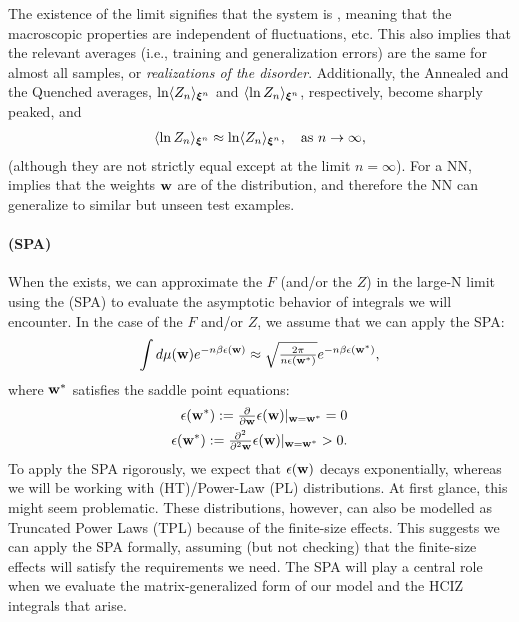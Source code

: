 The existence of the limit signifies that the system is \emph{\SelfAveraging}, meaning that
the macroscopic properties are independent of fluctuations, etc.
This also implies that the relevant averages
(i.e., training and generalization errors) are the same for almost all samples, or \emph{realizations of the disorder}.
Additionally, the Annealed and the Quenched averages,
$\ln \langle Z_n \rangle_{\boldsymbol{\xi}^{n}}$ and $\langle \ln Z_n \rangle_{\boldsymbol{\xi}^{n}}$, respectively,
become sharply peaked, and
\begin{align}
\langle \ln Z_n \rangle_{\boldsymbol{\xi}^{n}} \approx \ln \langle Z_n \rangle_{\boldsymbol{\xi}^{n}}, \quad \text{as } n \to \infty,
\end{align}
(although they are not strictly equal except at the limit $n = \infty$).
For a NN, \SelfAveraging implies that the weights ${\mathbf{w}}$ are \emph{\Typical} of the distribution,
and therefore the NN can generalize to similar but unseen test examples.

\paragraph{\SaddlePointApproximation (SPA)}
When the \ThermodynamicLimit exists, 
we can approximate the  \FreeEnergy $F$ 
(and/or the \PartitionFunction $Z$) in the large-N limit
using the \SaddlePointApproximation (SPA) to evaluate the asymptotic behavior of 
integrals we will encounter.
In the case of the $F$ and/or $Z$, we assume that we can apply the SPA:
\begin{align}
  \label{eqn:SPA}
  \int d\mu({\mathbf{w}}) e^{-n\beta\epsilon({\mathbf{w}})}\approx \sqrt{\tfrac{2\pi}{n\epsilon({\mathbf{w}}^{*})}} e^{-n\beta\epsilon({\mathbf{w}}^{*})}  ,
\end{align}
where ${\mathbf{w}}^{*}$ satisfies the saddle point equations:
\begin{align}
  \epsilon({\mathbf{w}}^{*}):=\tfrac{\partial}{\partial {\mathbf{w}}}\epsilon({\mathbf{w}})\vert_{{\mathbf{w}}={\mathbf{w}}^{*}}=0 \\
  \epsilon({\mathbf{w}}^{*}):=\tfrac{\partial^{2}}{\partial^{2} {\mathbf{w}}}\epsilon({\mathbf{w}})\vert_{{\mathbf{w}}={\mathbf{w}}^{*}}>0  .
\end{align}
To apply the SPA rigorously, we expect that $\epsilon({\mathbf{w}})$ decays exponentially,
whereas we will be working with \HeavyTailed (HT)/Power-Law (PL) distributions.
At first glance, this might seem problematic.
These distributions, however, can also be modelled as Truncated Power Laws (TPL) because of the finite-size effects. 
This suggests we can apply the SPA formally, assuming (but not checking) that the finite-size effects will satisfy the requirements we need.
The SPA will play a central role when we evaluate the matrix-generalized form of our model and the HCIZ integrals that arise.


